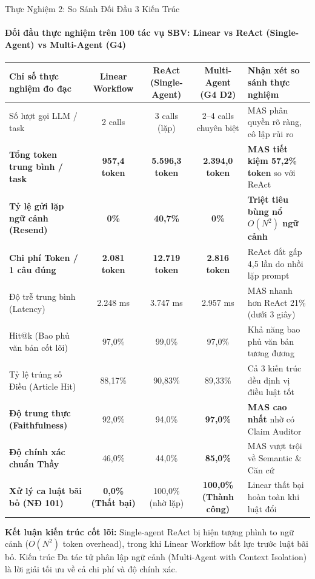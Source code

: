 \documentclass[aspectratio=169,10pt,xcolor={table}]{beamer}
\begin{document}
\begin{frame}{Thực Nghiệm 2: So Sánh Đối Đầu 3 Kiến Trúc}
\framesubtitle{Đối đầu thực nghiệm trên 100 tác vụ SBV: Linear vs ReAct (Single-Agent) vs Multi-Agent (G4)}
\centering
\scriptsize
\begin{tabularx}{0.98\linewidth}{@{}p{4.2cm} c c c X@{}}
\toprule
\textbf{Chỉ số thực nghiệm đo đạc} & \textbf{Linear Workflow} & \textbf{ReAct (Single-Agent)} & \textbf{Multi-Agent (G4 D2)} & \textbf{Nhận xét so sánh thực nghiệm} \\ \midrule
Số lượt gọi LLM / task & 2 calls & 3 calls (lặp) & 2--4 calls chuyên biệt & MAS phân quyền rõ ràng, cô lập rủi ro \\
\textbf{Tổng token trung bình / task} & \textbf{957,4 token} & \textbf{5.596,3 token} & \textbf{2.394,0 token} & \textbf{MAS tiết kiệm 57,2\% token} so với ReAct \\
\textbf{Tỷ lệ gửi lặp ngữ cảnh (Resend)}& \textbf{0\%} & \textbf{40,7\%} & \textbf{0\%} & \textbf{Triệt tiêu bùng nổ $O(N^2)$ ngữ cảnh} \\
\textbf{Chi phí Token / 1 câu đúng} & \textbf{2.081 token} & \textbf{12.719 token} & \textbf{2.816 token} & ReAct đắt gấp 4,5 lần do nhồi lặp prompt \\
Độ trễ trung bình (Latency) & 2.248 ms & 3.747 ms & 2.957 ms & MAS nhanh hơn ReAct 21\% (dưới 3 giây) \\
Hit@k (Bao phủ văn bản cốt lõi) & 97,0\% & 99,0\% & 97,0\% & Khả năng bao phủ văn bản tương đương \\
Tỷ lệ trúng số Điều (Article Hit) & 88,17\% & 90,83\% & 89,33\% & Cả 3 kiến trúc đều định vị điều luật tốt \\
\textbf{Độ trung thực (Faithfulness)} & 92,0\% & 94,0\% & \textbf{97,0\%} & \textbf{MAS cao nhất} nhờ có Claim Auditor \\
\textbf{Độ chính xác chuẩn Thầy} & 46,0\% & 44,0\% & \textbf{85,0\%} & MAS vượt trội về Semantic \& Căn cứ \\
\textbf{Xử lý ca luật bãi bỏ (NĐ 101)} & \textbf{0,0\% (Thất bại)} & 100,0\% (nhờ lặp) & \textbf{100,0\% (Thành công)} & Linear thất bại hoàn toàn khi luật đổi \\
\bottomrule
\end{tabularx}
\vskip0.12cm
\begin{tcolorbox}[colback=hcmutblue!10,colframe=hcmutblue,boxrule=0.5pt,top=2pt,bottom=2pt,left=4pt,right=4pt]
\scriptsize\textbf{Kết luận kiến trúc cốt lõi:} Single-agent ReAct bị hiện tượng phình to ngữ cảnh ($O(N^2)$ token overhead), trong khi Linear Workflow bất lực trước luật bãi bỏ. Kiến trúc Đa tác tử phân lập ngữ cảnh (Multi-Agent with Context Isolation) là lời giải tối ưu về cả chi phí và độ chính xác.
\end{tcolorbox}
\end{frame}
\end{document}
